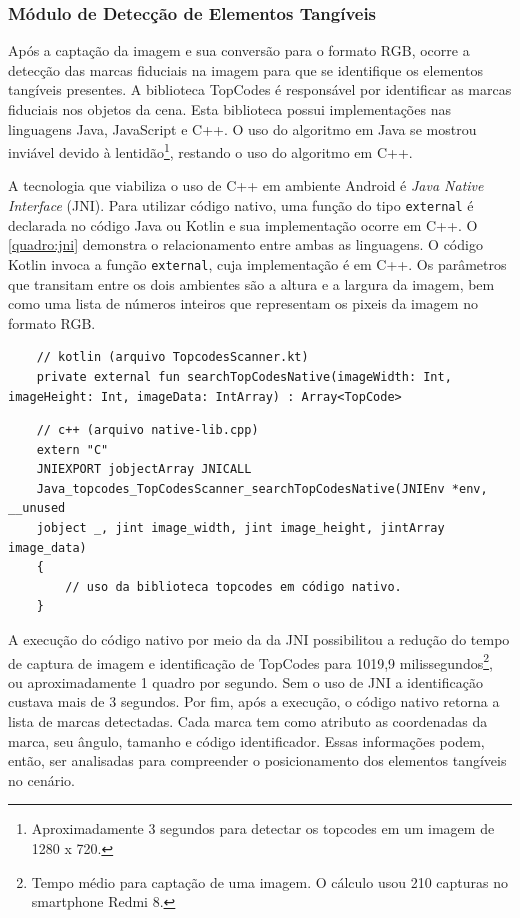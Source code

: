 \subsubsection{Módulo de Detecção de Elementos Tangíveis}

Após a captação da imagem e sua conversão para o formato RGB, ocorre a detecção das marcas fiduciais na imagem para que se identifique os elementos tangíveis presentes. A biblioteca TopCodes é responsável por identificar as marcas fiduciais nos objetos da cena. Esta biblioteca possui implementações nas linguagens Java, JavaScript e C++. O uso do algoritmo em Java se mostrou inviável devido à lentidão\footnote{Aproximadamente 3 segundos para detectar os topcodes em um imagem de 1280 x 720.}, restando o uso do algoritmo em C++. 

A tecnologia que viabiliza o uso de C++ em ambiente Android é \textit{Java Native Interface} (JNI). Para utilizar código nativo, uma função do tipo \texttt{external} é declarada no código Java ou Kotlin e sua implementação ocorre em C++. O \autoref{quadro:jni} demonstra o relacionamento entre ambas as linguagens. O código Kotlin invoca a função \texttt{external}, cuja implementação é em C++. Os parâmetros que transitam entre os dois ambientes são a altura e a largura da imagem, bem como uma lista de números inteiros que representam os pixeis da imagem no formato RGB.

\begin{quadro}[!h]
    \begin{verbatim}
    // kotlin (arquivo TopcodesScanner.kt)
    private external fun searchTopCodesNative(imageWidth: Int, imageHeight: Int, imageData: IntArray) : Array<TopCode>
    \end{verbatim}
    
    \begin{verbatim}
    // c++ (arquivo native-lib.cpp)
    extern "C" 
    JNIEXPORT jobjectArray JNICALL
    Java_topcodes_TopCodesScanner_searchTopCodesNative(JNIEnv *env, __unused 
    jobject _, jint image_width, jint image_height, jintArray image_data) 
    { 
        // uso da biblioteca topcodes em código nativo.
    }
    \end{verbatim}
    \label{quadro:jni}
\end{quadro}

A execução do código nativo por meio da da JNI possibilitou a redução do tempo de captura de imagem e identificação de TopCodes para 1019,9 milissegundos\footnote{Tempo médio para captação de uma imagem. O cálculo usou 210 capturas no smartphone Redmi 8. }, ou aproximadamente 1 quadro por segundo. Sem o uso de JNI a identificação custava mais de 3 segundos. 
Por fim, após a execução, o código nativo retorna a lista de marcas detectadas. Cada marca tem como atributo as coordenadas da marca, seu ângulo, tamanho e código identificador. Essas informações podem, então, ser analisadas para compreender o posicionamento dos elementos tangíveis no cenário.

